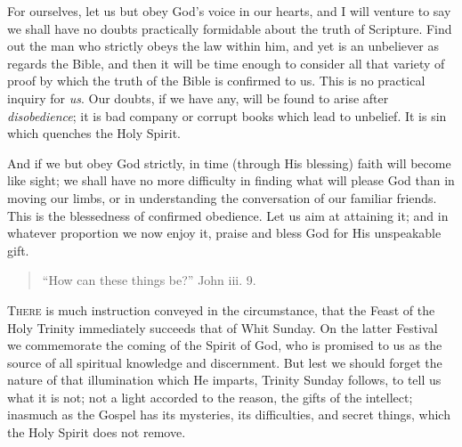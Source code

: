 For ourselves, let us but obey God's voice in our
hearts, and I will venture to say we shall have no doubts
practically formidable about the truth of Scripture. Find
out the man who strictly obeys the law within him, and
yet is an unbeliever as regards the Bible, and then it
will be time enough to consider all that variety of proof
by which the truth of the Bible is confirmed to us. This
is no practical inquiry for \emph{us}. Our doubts, if we
have any, will be found to arise after \emph{disobedience};
it is bad company or corrupt books which lead to
unbelief. It is sin which quenches the Holy Spirit.

And if we but obey God strictly, in time (through His
blessing) faith will become like sight; we shall have no
more difficulty in finding what will please God than in
moving our limbs, or in understanding the conversation of
our familiar friends. This is the blessedness of
confirmed obedience. Let us aim at attaining it; and in
whatever proportion we now enjoy it, praise and bless God
for His unspeakable gift.


\begin{quote}

``How can these things be?'' John iii. 9.

\end{quote}

T\textsc{here} is much instruction conveyed in the
circumstance, that the Feast of the Holy Trinity
immediately succeeds that of Whit Sunday. On the latter
Festival we commemorate the coming of the Spirit of God,
who is promised to us as the source of all spiritual
knowledge and discernment. But lest we should forget the
nature of that illumination which He imparts, Trinity
Sunday follows, to tell us what it is not; not a light
accorded to the reason, the gifts of the intellect;
inasmuch as the Gospel has its mysteries, its
difficulties, and secret things, which the Holy Spirit
does not remove.

